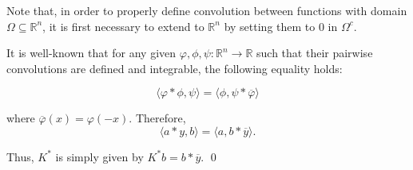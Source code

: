 \documentclass[twocolumn,twoside,a4paper,10pt]{IEEEtran}
\begin{document}
Note that, in order to properly define convolution between functions with domain \(\Omega\subseteq\mathbb{R}^n\), it is first necessary to extend to \(\mathbb{R}^n\) by setting them to \(0\) in \(\Omega^c\).

It is well-known that for any given \(\varphi, \phi, \psi\colon\mathbb{R}^n\to\mathbb{R}\) such that their pairwise convolutions are defined and integrable, the following equality holds:

\begin{equation}\label{eq:convolution/inversion}
  \langle\varphi\ast\phi, \psi\rangle = \langle\phi, \psi\ast\overline{\varphi}\rangle
\end{equation}

where \(\overline{\varphi}(x) = \varphi(-x)\). Therefore,
\[
  \langle a\ast y, b\rangle = \langle a, b\ast\overline{y} \rangle
.\]

Thus, \(K^*\) is simply given by \(K^*b = b\ast \overline{y}\). \qed



\end{document}
